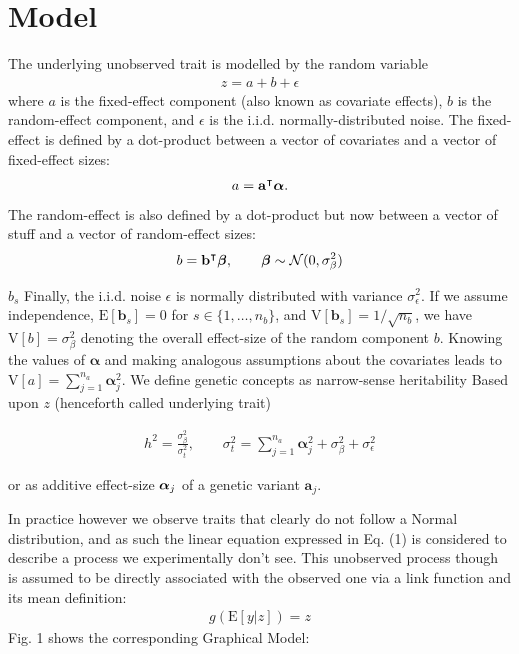 \section{Model}

The underlying unobserved trait is modelled by the random variable
\begin{align*}
  z = a + b + \epsilon
\end{align*} where $a$ is the fixed-effect
component (also known as covariate effects), $b$ is the random-effect component,
and $\epsilon$ is the i.i.d. normally-distributed noise.
The fixed-effect is defined by a dot-product between a vector of covariates and
a vector of fixed-effect sizes:
\begin{align*}
  a = \mathbf a^\intercal \boldsymbol\alpha.
\end{align*}
The random-effect is also defined by a dot-product but now between
a vector of stuff and a vector of random-effect sizes:
\begin{align*}
  b = \mathbf b^\intercal \boldsymbol\beta, \qquad \boldsymbol\beta \sim \mathcal N(0, \sigma^2_{\beta})
\end{align*}

$b_s$
Finally, the i.i.d. noise $\epsilon$ is normally distributed with variance
$\sigma^2_{\epsilon}$. If we assume independence, $\mathrm E[\mathbf
b_s] = 0$ for $s \in \{1, \dots, n_b\}$, and
$\mathrm V[\mathbf b_s]=1/\sqrt{n_b}$, we have $\mathrm V[b] =
\sigma^2_{\beta}$ denoting the overall effect-size of the random component $b$.
Knowing the values of $\boldsymbol\alpha$ and making analogous
assumptions about the covariates leads to $\mathrm V[a]  =
\sum_{j=1}^{n_a} \boldsymbol \alpha_j^2$.
We define genetic concepts as narrow-sense heritability
Based upon $z$ (henceforth called underlying trait)

\begin{align*}
  h^2=\frac{\sigma^2_{\beta}}{\sigma_t^2}, \qquad \sigma_t^2 =
  \sum_{j=1}^{n_a} \boldsymbol \alpha_j^2 + \sigma^2_{\beta} +
  \sigma^2_{\epsilon}
\end{align*}

or as additive effect-size $\boldsymbol\alpha_j$ of a genetic variant $\mathbf a_j$.

In practice however we observe traits that clearly do not follow a Normal
distribution, and as such the linear equation expressed in Eq. (1) is
considered to describe a process we experimentally don't see.
This unobserved process though is assumed to be directly associated with the
observed one via a link function and its mean definition:
\begin{align*}
  g(\mathrm E[y|z]) = z
\end{align*}
Fig. 1 shows the corresponding Graphical Model:

